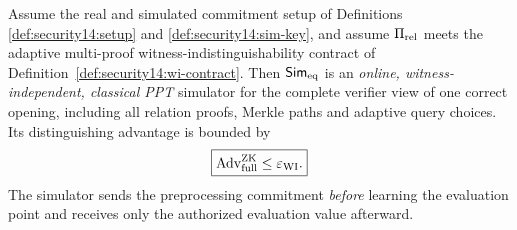 \begin{theorem}\label{thm:security14:online-zk}
Assume the real and simulated
commitment setup
of Definitions
\ref{def:security14:setup} and
\ref{def:security14:sim-key},
and assume
$\Pi_{\rm rel}$ meets the
adaptive multi-proof
witness-indistinguishability
contract of
Definition~\ref{def:security14:wi-contract}.
Then
$\mathsf{Sim}_{\rm eq}$
is an \emph{online,
witness-independent,
classical PPT} simulator
for the complete verifier
view of one correct opening,
including all relation
proofs, Merkle paths and
adaptive query choices.
Its distinguishing
advantage is bounded by
\[
 \boxed{
 \operatorname{Adv}^{\rm ZK}_{\rm full}
 \le \varepsilon_{\rm WI}.}
\]
The simulator sends the
preprocessing commitment
\emph{before} learning the
evaluation point and receives
only the authorized evaluation
value afterward.
\end{theorem}
